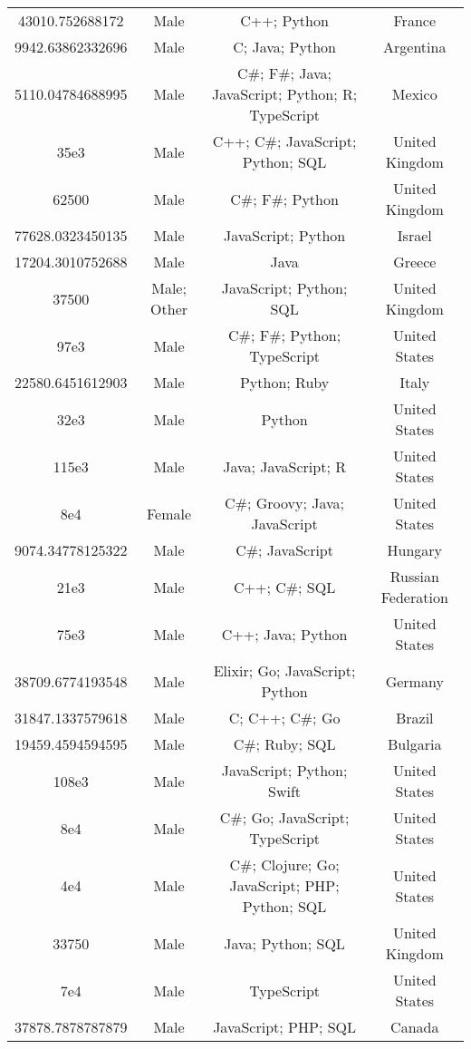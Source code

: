 \begin{center}
\begin{tabular}{ |c|c|c|c| }
43010.752688172  &  Male  &  C++; Python  &  France  \\ 
9942.63862332696  &  Male  &  C; Java; Python  &  Argentina  \\ 
5110.04784688995  &  Male  &  C\#; F\#; Java; JavaScript; Python; R; TypeScript  &  Mexico  \\ 
35e3  &  Male  &  C++; C\#; JavaScript; Python; SQL  &  United Kingdom  \\ 
62500  &  Male  &  C\#; F\#; Python  &  United Kingdom  \\ 
77628.0323450135  &  Male  &  JavaScript; Python  &  Israel  \\ 
17204.3010752688  &  Male  &  Java  &  Greece  \\ 
37500  &  Male; Other  &  JavaScript; Python; SQL  &  United Kingdom  \\ 
97e3  &  Male  &  C\#; F\#; Python; TypeScript  &  United States  \\ 
22580.6451612903  &  Male  &  Python; Ruby  &  Italy  \\ 
32e3  &  Male  &  Python  &  United States  \\ 
115e3  &  Male  &  Java; JavaScript; R  &  United States  \\ 
8e4  &  Female  &  C\#; Groovy; Java; JavaScript  &  United States  \\ 
9074.34778125322  &  Male  &  C\#; JavaScript  &  Hungary  \\ 
21e3  &  Male  &  C++; C\#; SQL  &  Russian Federation  \\ 
75e3  &  Male  &  C++; Java; Python  &  United States  \\ 
38709.6774193548  &  Male  &  Elixir; Go; JavaScript; Python  &  Germany  \\ 
31847.1337579618  &  Male  &  C; C++; C\#; Go  &  Brazil  \\ 
19459.4594594595  &  Male  &  C\#; Ruby; SQL  &  Bulgaria  \\ 
108e3  &  Male  &  JavaScript; Python; Swift  &  United States  \\ 
8e4  &  Male  &  C\#; Go; JavaScript; TypeScript  &  United States  \\ 
4e4  &  Male  &  C\#; Clojure; Go; JavaScript; PHP; Python; SQL  &  United States  \\ 
33750  &  Male  &  Java; Python; SQL  &  United Kingdom  \\ 
7e4  &  Male  &  TypeScript  &  United States  \\ 
37878.7878787879  &  Male  &  JavaScript; PHP; SQL  &  Canada  \\ 

\end{tabular}
\end{center}
